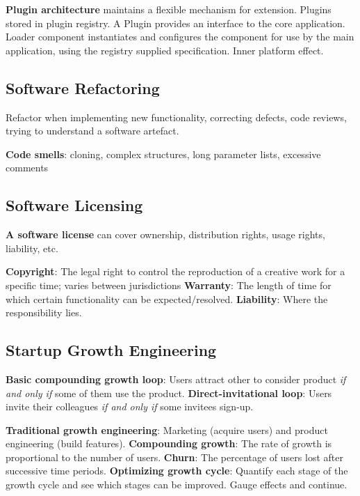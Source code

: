 \documentclass{article}
\begin{document}
\noindent \textbf{Plugin architecture} maintains a flexible mechanism for extension.
Plugins stored in plugin registry.
A Plugin provides an interface to the core application.
Loader component instantiates and configures the component for use by the main application, using the registry supplied specification.
Inner platform effect.


\subsection*{Software Refactoring}

Refactor when implementing new functionality, correcting defects, code reviews, trying to understand a software artefact.

\noindent \textbf{Code smells}: cloning, complex structures, long parameter lists, excessive comments 


\subsection*{Software Licensing}

\noindent \textbf{A software license} can cover ownership, distribution rights, usage rights, liability, etc.

\noindent \textbf{Copyright}: The legal right to control the reproduction of a creative work for a specific time; varies between jurisdictions
\noindent \textbf{Warranty}: The length of time for which certain functionality can be expected/resolved.
\noindent \textbf{Liability}: Where the responsibility lies.


\subsection*{Startup Growth Engineering}

\noindent \textbf{Basic compounding growth loop}: Users attract other to consider product \textit{if and only if} some of them use the product.
\noindent \textbf{Direct-invitational loop}: Users invite their colleagues \textit{if and only if} some invitees sign-up.

\noindent \textbf{Traditional growth engineering}: Marketing (acquire users) and product engineering (build features).
\noindent \textbf{Compounding growth}: The rate of growth is proportional to the number of users.
\noindent \textbf{Churn}: The percentage of users lost after successive time periods.
\noindent \textbf{Optimizing growth cycle}: Quantify each stage of the growth cycle and see which stages can be improved. Gauge effects and continue.
\end{document}
